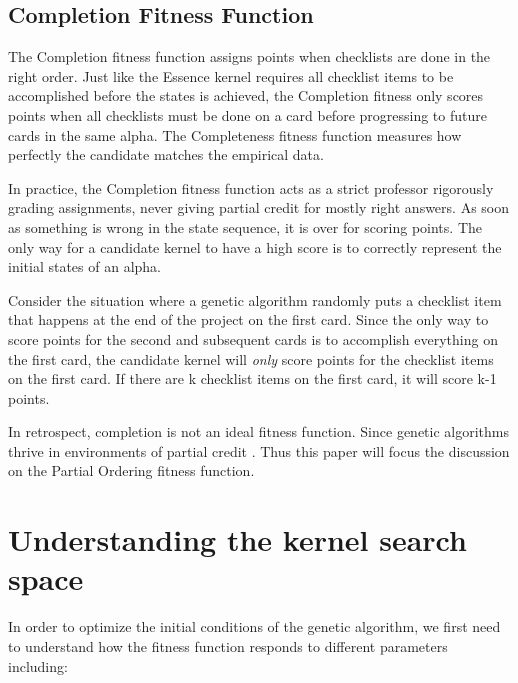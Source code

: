 \documentclass[conference]{IEEEtran}
\begin{document}
\subsection{Completion Fitness Function}
The Completion fitness function assigns points when checklists are done in the right order. Just like the Essence kernel requires all checklist items to be accomplished before the states is achieved, the Completion fitness only scores points when all checklists must be done on a card before progressing to future cards in the same alpha. The Completeness fitness function measures how perfectly the candidate matches the empirical data. 


In practice, the Completion fitness function acts as a strict professor rigorously grading assignments, never giving partial credit for mostly right answers. As soon as something is wrong in the state sequence, it is over for scoring points. The only way for a candidate kernel to have a high score is to correctly represent the initial states of an alpha.

Consider the situation where a genetic algorithm randomly puts a checklist item that happens at the end of the project on the first card. Since the only way to score points for the second and subsequent cards is to accomplish everything on the first card, the candidate kernel will \textit{only} score points for the checklist items on the first card. If there are k checklist items on the first card, it will score k-1 points.

In retrospect, completion is not an ideal fitness function. Since genetic algorithms thrive in environments of partial credit \cite{Eiben2003}. Thus this paper will focus the discussion on the Partial Ordering fitness function.

\section{Understanding the kernel search space}
In order to optimize the initial conditions of the genetic algorithm, we first need to understand how the fitness function responds to different parameters including:
\end{document}
